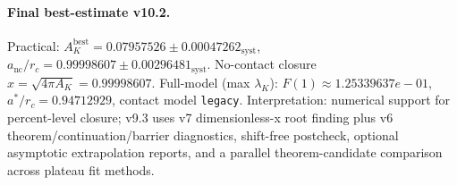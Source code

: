\paragraph{Final best-estimate v10.2.}
Practical: $A_K^{\mathrm{best}} = 0.07957526 \pm 0.00047262_{\mathrm{syst}}$, $a_{\mathrm{nc}}/r_c = 0.99998607 \pm 0.00296481_{\mathrm{syst}}$.
No-contact closure $x = \sqrt{4\pi A_K} = 0.99998607$.
Full-model (max $\lambda_K$): $F(1) \approx 1.25339637e-01$, $a^*/r_c = 0.94712929$, contact model \texttt{legacy}.
Interpretation: numerical support for percent-level closure; v9.3 uses v7 dimensionless-x root finding plus v6 theorem/continuation/barrier diagnostics, shift-free postcheck, optional asymptotic extrapolation reports, and a parallel theorem-candidate comparison across plateau fit methods.
